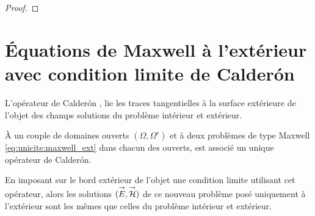 \begin{proof}
      
    
    \end{proof}      

\section{Équations de Maxwell à l'extérieur avec condition limite de Calderón}
  L'opérateur de Calderón \cite[Def~4, p.~108]{cessenat_mathematical_1996}, lie les traces tangentielles à la surface extérieure de l'objet des champs solutions du problème intérieur et extérieur.
  
  À un couple de domaines ouverts \((\Omega, \Omega^c)\) et à deux problèmes de type Maxwell \eqref{eq:unicite:maxwell_ext} dans chacun des ouverts, est associé un unique opérateur de Calderón.

  En imposant sur le bord extérieur de l'objet une condition limite utilisant cet opérateur, alors les solutions \(({\overset{\rightarrow}{E}},{\overset{\rightarrow}{\mathcal{H}}})\) de ce nouveau problème posé uniquement à l'extérieur sont les mêmes que celles du problème intérieur et extérieur.

    

